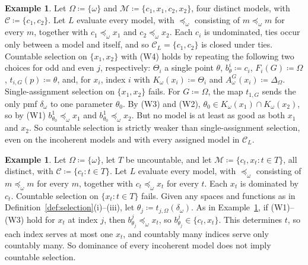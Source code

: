 \documentclass[11pt]{article}
\theoremstyle{definition}
\newtheorem{example}[theorem]{Example}
\theoremstyle{remark}
\newcommand{\M}{\mathcal M}
\newcommand{\C}{\mathcal C}
\begin{document}
\begin{example}\label{ex:two-pairs}
Let $\Omega\coloneqq\{\omega\}$ and $\M\coloneqq\{c_1,x_1,c_2,x_2\}$, four distinct models, with $\C\coloneqq\{c_1,c_2\}$. Let $L$ evaluate every model, with $\preceq_\omega$ consisting of $m\preceq_\omega m$ for every $m$, together with $c_1\preceq_\omega x_1$ and $c_2\preceq_\omega x_2$. Each $c_i$ is undominated, ties occur only between a model and itself, and so $\C_L=\{c_1,c_2\}$ is closed under ties. Countable selection on $\{x_1,x_2\}$ with (W4) holds by repeating the following two choices for odd and even $j$, respectively: $\Theta_i$ a single point $\theta$, $b^i_\theta\coloneqq c_i$, $F_i(G)\coloneqq\Omega$, $t_{i,G}(p)\coloneqq\theta$, and, for $x_i$, index $i$ with $K_\omega(x_i)\coloneqq\Theta_i$ and $A^G_\omega(x_i)\coloneqq\Delta_\Omega$. Single-assignment selection on $\{x_1,x_2\}$ fails. For $G\coloneqq\Omega$, the map $t_{1,G}$ sends the only pmf $\delta_\omega$ to one parameter $\theta_0$. By (W3) and (W2), $\theta_0\in K_\omega(x_1)\cap K_\omega(x_2)$, so by (W1) $b^1_{\theta_0}\preceq_\omega x_1$ and $b^1_{\theta_0}\preceq_\omega x_2$. But no model is at least as good as both $x_1$ and $x_2$. So countable selection is strictly weaker than single-assignment selection, even on the incoherent models and with every assigned model in $\C_L$.
\end{example}

\begin{example}\label{ex:uncountable}
Let $\Omega\coloneqq\{\omega\}$, let $T$ be uncountable, and let $\M\coloneqq\{c_t,x_t:t\in T\}$, all distinct, with $\C\coloneqq\{c_t:t\in T\}$. Let $L$ evaluate every model, with $\preceq_\omega$ consisting of $m\preceq_\omega m$ for every $m$, together with $c_t\preceq_\omega x_t$ for every $t$. Each $x_t$ is dominated by $c_t$. Countable selection on $\{x_t:t\in T\}$ fails. Given any spaces and functions as in Definition~\ref{def:selection}(i)--(iii), let $\theta_j\coloneqq t_{j,\Omega}(\delta_\omega)$. As in Example~\ref{ex:two-pairs}, if (W1)--(W3) hold for $x_t$ at index $j$, then $b^j_{\theta_j}\preceq_\omega x_t$, so $b^j_{\theta_j}\in\{c_t,x_t\}$. This determines $t$, so each index serves at most one $x_t$, and countably many indices serve only countably many. So dominance of every incoherent model does not imply countable selection.
\end{example}
\end{document}

